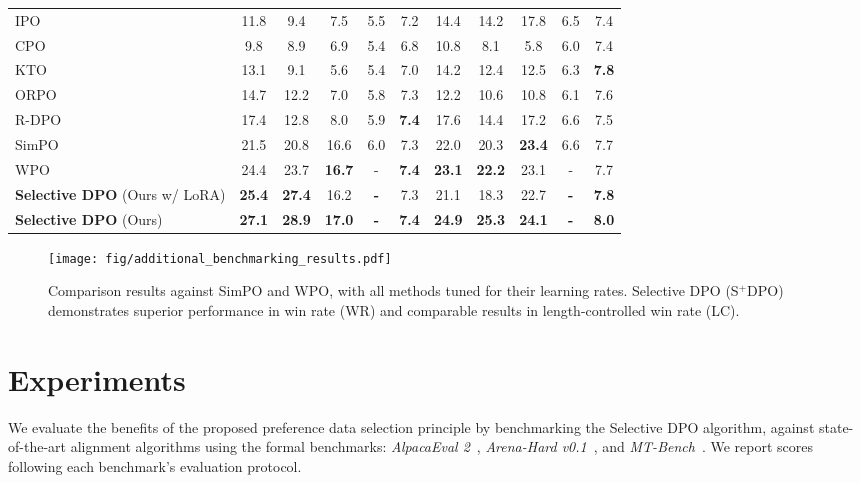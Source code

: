 \begin{table*}[!t]
{\begin{tabular}{lcccccccccc}
IPO~\cite{Azar2023AGT} & 11.8 & 9.4 & 7.5 & 5.5 & 7.2 & 14.4 & 14.2 & 17.8 & 6.5 & 7.4 \\
CPO~\cite{xu2024contrastive} &  9.8 &  8.9 &  6.9 & 5.4 & 6.8 & 10.8 &  8.1 &  5.8 & 6.0 & 7.4 \\
KTO~\cite{Ethayarajh2024KTOMA} & 13.1 & 9.1 & 5.6 & 5.4 & 7.0 & 14.2 & 12.4 & 12.5 & 6.3 & \textbf{7.8}  \\
ORPO~\cite{Hong2024ORPOMP} & 14.7 & 12.2 & 7.0 & 5.8 & 7.3 & 12.2 & 10.6 & 10.8 & 6.1 & 7.6 \\
R-DPO~\cite{Park2024DisentanglingLF} & 17.4 & 12.8 & 8.0 & 5.9 & \textbf{7.4} & 17.6 & 14.4 & 17.2 & 6.6 & 7.5 \\
SimPO~\cite{meng2024simpo} & 21.5 & 20.8 & 16.6 & 6.0 & 7.3 & 22.0 & 20.3 & \textbf{23.4} & 6.6 & 7.7 \\
WPO~\cite{zhou2024wpo} & 24.4 & 23.7 & \textbf{16.7} & - & \textbf{7.4} & \textbf{23.1} & \textbf{22.2} & 23.1 & - & 7.7 \\ 
\midrule
\textbf{Selective DPO} (Ours w/ LoRA) & \textbf{25.4} & \textbf{27.4} &  16.2 & \textbf{-} & 7.3 & 21.1 & {18.3} & 22.7 & \textbf{-} & \textbf{7.8} \\
\textbf{Selective DPO} (Ours) & \textbf{27.1} & \textbf{28.9} & \textbf{17.0} & \textbf{-} & \textbf{7.4} & \textbf{24.9} & \textbf{25.3} & \textbf{24.1} & \textbf{-} & \textbf{8.0} \\
\bottomrule
\end{tabular}
}
\label{tab:benchmarking-results}
\end{table*}
\begin{figure*}[!ht]
    \centering
    \texttt{[image: fig/additional\_benchmarking\_results.pdf]}
    \vspace{-0.8cm}
    \caption{Comparison results against SimPO and WPO, with all methods tuned for their learning rates. Selective DPO (S$^{+}$DPO) demonstrates superior performance in win rate (WR) and comparable results in length-controlled win rate (LC).}
    \vspace{-0.4cm}
    \label{fig:additional-benchmarking-results}
\end{figure*}

\section{Experiments}
\label{sec:benchmarking}
We evaluate the benefits of the proposed preference data selection principle by benchmarking the Selective DPO algorithm, against state-of-the-art alignment algorithms using the formal benchmarks: \textit{AlpacaEval 2}~\cite{dubois2024length}, \textit{Arena-Hard v0.1}~\cite{li2024crowdsourced}, and \textit{MT-Bench}~\cite{zheng2023judging}. We report scores following each benchmark’s evaluation protocol. 


